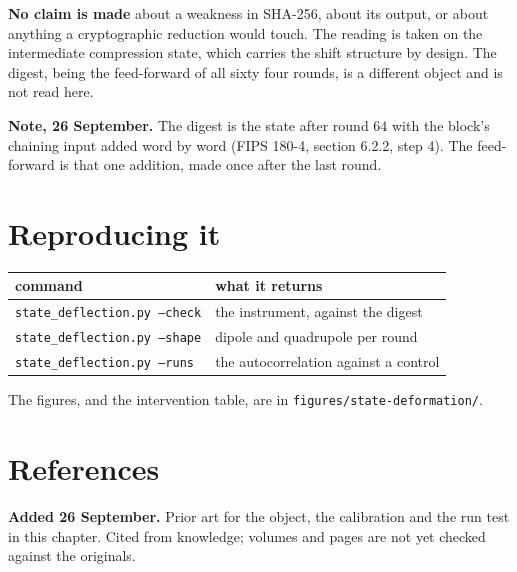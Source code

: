 \textbf{No claim is made} about a weakness in SHA-256, about its output, or about anything a cryptographic reduction would touch. The reading is taken on the intermediate compression state, which carries the shift structure by design. The digest, being the feed-forward of all sixty four rounds, is a different object and is not read here.

\textbf{Note, 26 September.} The digest is the state after round \(64\) with the block's chaining input added word by word (FIPS 180-4, section 6.2.2, step 4). The feed-forward is that one addition, made once after the last round.

\section{Reproducing it}

\begin{center}
\begin{tabular}{@{}ll@{}}
\toprule
command & what it returns \\
\midrule
\texttt{state\_deflection.py --check} & the instrument, against the digest \\
\texttt{state\_deflection.py --shape} & dipole and quadrupole per round \\
\texttt{state\_deflection.py --runs} & the autocorrelation against a control \\
\bottomrule
\end{tabular}
\end{center}

The figures, and the intervention table, are in \texttt{figures/\allowbreak{}state-deformation/}.

\section{References}

\textbf{Added 26 September.} Prior art for the object, the calibration and the run test in this chapter. Cited from knowledge; volumes and pages are not yet checked against the originals.

